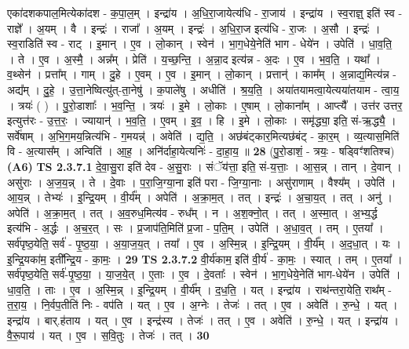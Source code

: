 \documentclass[17pt]{extarticle}
\begin{document}
                  एका॑दशकपाल॒मित्येका॑दश - क॒पा॒ल॒म् । इन्द्रा॑य । अ॒धि॒रा॒जायेत्य॑धि - रा॒जाय॑ । इन्द्रा॑य । स्व॒राज्ञ्॒ इति॑ स्व - राज्ञे᳚ । अ॒यम् । वै । इन्द्रः॑ । राजा᳚ । अ॒यम् । इन्द्रः॑ । अ॒धि॒रा॒ज इत्य॑धि - रा॒जः । अ॒सौ । इन्द्रः॑ । स्व॒राडिति॑ स्व - राट् । इ॒मान् । ए॒व । लो॒कान् । स्वेन॑ । भा॒ग॒धेये॒नेति॑ भाग - धेये॑न । उपेति॑ । धा॒व॒ति॒ । ते । ए॒व । अ॒स्मै॒ । अन्न᳚म् । प्रेति॑ । य॒च्छ॒न्ति॒ । अ॒न्ना॒द इत्य॑न्न - अ॒दः । ए॒व । भ॒व॒ति॒ । यथा᳚ । व॒थ्सेन॑ । प्रत्ता᳚म् । गाम् । दु॒हे । ए॒वम् । ए॒व ।  इ॒मान् । लो॒कान् । प्रत्तान्॑ । काम᳚म् । अ॒न्नाद्य॒मित्य॑न्न - अद्य᳚म् । दु॒हे॒ । उ॒त्ता॒नेष्वित्यु॑त्-ता॒नेषु॑ । क॒पाले॑षु । अधीति॑ । श्र॒य॒ति॒ । अया॑तयामत्वा॒येत्यया॑तयाम - त्वा॒य॒ । त्रयः॑ ( ) । पु॒रो॒डाशाः᳚ । भ॒व॒न्ति॒ । त्रयः॑ । इ॒मे । लो॒काः । ए॒षाम् । लो॒काना᳚म् । आप्त्यै᳚ । उत्त॑र उत्तर॒ इत्युत्त॑रः - उ॒त्त॒रः॒ । ज्यायान्॑ । भ॒व॒ति॒ । ए॒वम् । इ॒व॒ । हि । इ॒मे । लो॒काः । समृ॑द्ध्या॒ इति॒ सं-ऋ॒द्ध्यै॒ ।  सर्वे॑षाम् । अ॒भि॒ग॒मय॒न्नित्य॑भि - ग॒मयन्न्॑ । अवेति॑ । द्य॒ति॒ । अछ॑बंट्कार॒मित्यछ॑बंट् - का॒र॒म् । व्य॒त्यास॒मिति॑ वि - अ॒त्यास᳚म् । अन्विति॑ । आ॒ह॒ । अनि॑र्दाहा॒येत्यनिः॑ - दा॒हा॒य॒ ॥ \textbf{  28} \newline
                  \newline
                      (पु॒रो॒डाशं॒ - त्रयः॒ - षड्विꣳ॑शतिश्च)  \textbf{(A6)} \newline \newline
                                \textbf{ TS 2.3.7.1} \newline
                  दे॒वा॒सु॒रा इति॑ देव - अ॒सु॒राः । संॅय॑त्ता॒ इति॒ सं-य॒त्ताः॒ । आ॒स॒न्न् । तान् । दे॒वान् । असु॑राः । अ॒ज॒य॒न्न् । ते । दे॒वाः । प॒रा॒जि॒ग्या॒ना इति॑ परा - जि॒ग्या॒नाः । असु॑राणाम् । वैश्य᳚म् । उपेति॑ । आ॒य॒न्न् । तेभ्यः॑ । इ॒न्द्रि॒यम् । वी॒र्य᳚म् । अपेति॑ । अ॒क्रा॒म॒त् । तत् । इन्द्रः॑ । अ॒चा॒य॒त् । तत् । अनु॑ । अपेति॑ । अ॒क्रा॒म॒त् । तत् । अ॒व॒रुध॒मित्य॑व - रुध᳚म् । न । अ॒श॒क्नो॒त् । तत् । अ॒स्मा॒त् । अ॒भ्य॒र्द्ध इत्य॑भि - अ॒र्द्धः । अ॒च॒र॒त् । सः । प्र॒जाप॑ति॒मिति॑ प्र॒जा - प॒ति॒म् । उपेति॑ । अ॒धा॒व॒त् । तम् । ए॒तया᳚ । सर्व॑पृष्ठ॒येति॒ सर्व॑ - पृ॒ष्ठ॒या॒ । अ॒या॒ज॒य॒त् । तया᳚ । ए॒व । अ॒स्मि॒न्न् । इ॒न्द्रि॒यम् । वी॒र्य᳚म् । अ॒द॒धा॒त् । यः । इ॒न्द्रि॒यका॑म॒ इती᳚न्द्रि॒य - का॒मः॒ । \textbf{  29} \newline
                  \newline
                                \textbf{ TS 2.3.7.2} \newline
                  वी॒र्य॑काम॒ इति॑ वी॒र्य॑ - का॒मः॒ । स्यात् । तम् । ए॒तया᳚ । सर्व॑पृष्ठ॒येति॒ सर्व॑-पृ॒ष्ठ॒या॒ । या॒ज॒ये॒त् । ए॒ताः । ए॒व । दे॒वताः᳚ । स्वेन॑ । भा॒ग॒धेये॒नेति॑ भाग-धेये॑न । उपेति॑ । धा॒व॒ति॒ । ताः । ए॒व । अ॒स्मि॒न्न् । इ॒न्द्रि॒यम् । वी॒र्य᳚म् । द॒ध॒ति॒ । यत् । इन्द्रा॑य । राथ॑न्तरा॒येति॒ राथ᳚म् - त॒रा॒य॒ । नि॒र्वप॒तीति॑ निः - वप॑ति । यत् । ए॒व । अ॒ग्नेः । तेजः॑ ।   तत् । ए॒व । अवेति॑ । रु॒न्धे॒ । यत् । इन्द्रा॑य । बार्.ह॑ताय । यत् । ए॒व । इन्द्र॑स्य । तेजः॑ । तत् । ए॒व । अवेति॑ ।   रु॒न्धे॒ । यत् । इन्द्रा॑य । वै॒रू॒पाय॑ । यत् । ए॒व । स॒वि॒तुः । तेजः॑ । तत् । \textbf{  30} \newline
\end{document}
